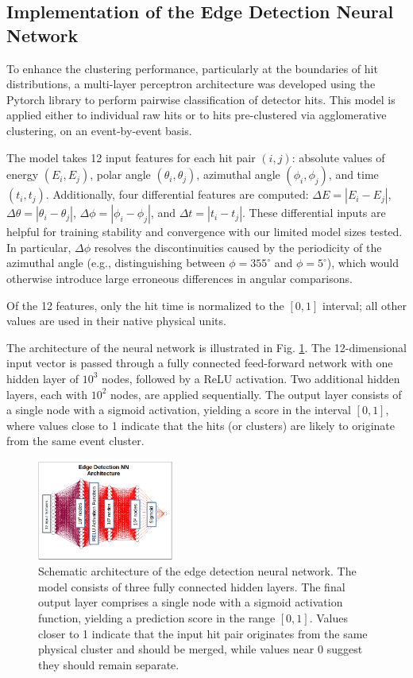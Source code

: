 \documentclass[final,5p,times,twocolumn]{elsarticle}
\begin{document}
\subsection{Implementation of the Edge Detection Neural Network}\label{s_sec:edge}
To enhance the clustering performance, particularly at the boundaries of hit distributions, a multi-layer perceptron architecture was developed using the Pytorch library \cite{imambi2021pytorch} to perform pairwise classification of detector hits. This model is applied either to individual raw hits or to hits pre-clustered via agglomerative clustering, on an event-by-event basis.

The model takes 12 input features for each hit pair $(i, j)$: absolute values of energy $(E_i, E_j)$, polar angle $(\theta_i, \theta_j)$, azimuthal angle $(\phi_i, \phi_j)$, and time $(t_i, t_j)$. Additionally, four differential features are computed: $\Delta E = |E_i - E_j|$, $\Delta \theta = |\theta_i - \theta_j|$, $\Delta \phi = |\phi_i - \phi_j|$, and $\Delta t = |t_i - t_j|$. These differential inputs are helpful for training stability and convergence with our limited model sizes tested. In particular, $\Delta \phi$ resolves the discontinuities caused by the periodicity of the azimuthal angle (e.g., distinguishing between $\phi = 355^\circ$ and $\phi = 5^\circ$), which would otherwise introduce large erroneous differences in angular comparisons.

Of the 12 features, only the hit time is normalized to the $[0, 1]$ interval; all other values are used in their native physical units.

The architecture of the neural network is illustrated in Fig. \ref{fig:architecture}. The 12-dimensional input vector is passed through a fully connected feed-forward network with one hidden layer of $10^3$ nodes, followed by a ReLU activation. Two additional hidden layers, each with $10^2$ nodes, are applied sequentially. The output layer consists of a single node with a sigmoid activation, yielding a score in the interval $[0, 1]$, where values close to 1 indicate that the hits (or clusters) are likely to originate from the same event cluster.
\begin{figure}[!htb]
	\centering 
	\includegraphics[width=0.4\textwidth]{architecture.png}	
	\caption{Schematic architecture of the edge detection neural network. The model consists of three fully connected hidden layers. The final output layer comprises a single node with a sigmoid activation function, yielding a prediction score in the range $[0, 1]$. Values closer to 1 indicate that the input hit pair originates from the same physical cluster and should be merged, while values near 0 suggest they should remain separate.}
	\label{fig:architecture}%
\end{figure}
\end{document}
